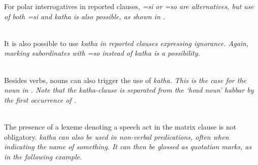 For polar interrogatives in reported clauses,  \em =si \em {} or \em =so \em {} are alternatives, but use of both \em =si \em and \em katha \em is also possible, as shown in .

 \\


It is also possible to use \em katha \em in reported clauses expressing ignorance. Again, marking subordinates with \em =so \em instead of \em katha \em is a possibility.


 \\ 
Besides verbs, nouns can also trigger the use of \em katha\em. This is the case for the noun  in . Note that the \em katha\em-clause is separated from the `head noun' \em habbar \em by the first occurrence of .

 \\

The presence of a lexeme denoting a speech act in the matrix clause is not obligatory. \em katha \em can also be used in non-verbal predications, often when indicating the name of something. It can then be glossed as quotation marks, as in the following example.


